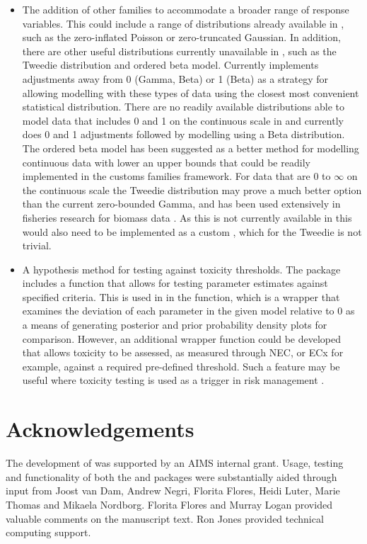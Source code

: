 \documentclass[
  shortnames]{jss}
\begin{document}
\begin{itemize}
\item
  The addition of other families to accommodate a broader range of response variables. This could include a range of distributions already available in , such as the zero-inflated Poisson or zero-truncated Gaussian. In addition, there are other useful distributions currently unavailable in , such as the Tweedie distribution and ordered beta model. Currently  implements adjustments away from 0 (Gamma, Beta) or 1 (Beta) as a strategy for allowing modelling with these types of data using the closest most convenient statistical distribution. There are no readily available distributions able to model data that includes 0 and 1 on the continuous scale in  and  currently does 0 and 1 adjustments followed by modelling using a Beta distribution. The ordered beta model has been suggested as a better method for modelling continuous data with lower an upper bounds \citep[see][]{Kubinec} that could be readily implemented in the  customs families framework. For data that are 0 to \(\infty\) on the continuous scale the Tweedie distribution may prove a much better option than the current zero-bounded Gamma, and has been used extensively in fisheries research for biomass data \citep{Shono2008}. As this  is not currently available in  this would also need to be implemented as a custom , which for the Tweedie is not trivial.
\item
  A hypothesis method for testing against toxicity thresholds. The  package includes a  function that allows for testing parameter estimates against specified criteria. This is used in  in the  function, which is a wrapper that examines the deviation of each parameter in the given model relative to 0 as a means of generating posterior and prior probability density plots for comparison. However, an additional wrapper function could be developed that allows toxicity to be assessed, as measured through NEC, or ECx for example, against a required pre-defined threshold. Such a feature may be useful where toxicity testing is used as a trigger in risk management \citep[for example, using whole-effluent-toxicity (WET) testing,][]{Karman2019}.
\end{itemize}

\hypertarget{acknowledgements}{%
\section{Acknowledgements}\label{acknowledgements}}

The development of  was supported by an AIMS internal grant. Usage, testing and functionality of both the  and  packages were substantially aided through input from Joost van Dam, Andrew Negri, Florita Flores, Heidi Luter, Marie Thomas and Mikaela Nordborg. Florita Flores and Murray Logan provided valuable comments on the manuscript text. Ron Jones provided technical computing support.

\renewcommand\refname{References}

\end{document}
